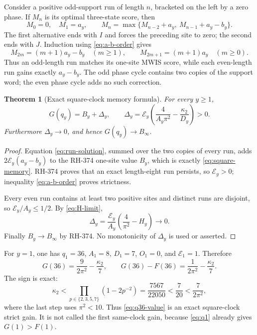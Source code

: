 \documentclass[11pt]{article}
\newtheorem{theorem}{Theorem}[section]
\theoremstyle{definition}
\theoremstyle{remark}
\newcommand{\kap}{\kappa_2}
\newcommand{\Ecal}{\mathcal E}
\begin{document}
Consider a positive odd-support run of length $n$, bracketed on the left by
a zero phase.  If $M_n$ is its optimal three-state score, then
\begin{equation}
 M_0=0,\quad M_1=a_y,\qquad
 M_n=\max\{M_{n-2}+a_y,\ M_{n-1}+a_y-b_y\}.
 \label{eq:run-recurrence}
\end{equation}
The first alternative ends with $I$ and forces the preceding site to zero;
the second ends with $J$.  Induction using \eqref{eq:a-b-order} gives
\begin{equation}
 M_{2m}=(m+1)a_y-b_y\quad(m\ge1),
 \qquad
 M_{2m+1}=(m+1)a_y\quad(m\ge0).
 \label{eq:run-solution}
\end{equation}
Thus an odd-length run matches its one-site MWIS score, while each
even-length run gains exactly $a_y-b_y$.  The odd phase cycle contains two
copies of the support word; the even phase cycle adds no such correction.

\begin{theorem}[Exact square-clock memory formula]
\label{thm:square-memory}
For every $y\ge1$,
\begin{equation}
 \boxed{\displaystyle
 G(q_y)=B_y+\Delta_y,\qquad
 \Delta_y=\Ecal_y\left(\frac4{A_y\pi^2}-\frac{\kap}{D_y}\right)>0.}
 \label{eq:square-memory}
\end{equation}
Furthermore $\Delta_y\to0$, and hence $G(q_y)\to B_\infty$.
\end{theorem}

\begin{proof}
Equation \eqref{eq:run-solution}, summed over the two copies of every run,
adds $2\Ecal_y(a_y-b_y)$ to the RH-374 one-site value $B_y$, which is
exactly \eqref{eq:square-memory}.  RH-374 proves that an exact length-eight
run persists, so $\Ecal_y>0$; inequality \eqref{eq:a-b-order} proves
strictness.

Every even run contains at least two positive sites and distinct runs are
disjoint, so $\Ecal_y/A_y\le1/2$.  By \eqref{eq:H-limit},
\[
 \Delta_y=\frac{\Ecal_y}{A_y}
           \left(\frac4{\pi^2}-H_y\right)\longrightarrow0.
\]
Finally $B_y\to B_\infty$ by RH-374.  No monotonicity of $\Delta_y$ is used
or asserted.
\end{proof}

For $y=1$, one has $q_1=36$, $A_1=8$, $D_1=7$, $O_1=0$, and
$\Ecal_1=1$.  Therefore
\begin{equation}
 G(36)=\frac9{2\pi^2}-\frac{\kap}{7},
 \qquad
 G(36)-F(36)=\frac1{2\pi^2}-\frac{\kap}{7}.
 \label{eq:q36-value}
\end{equation}
The sign is exact:
\begin{equation}
 \kap<\prod_{p\in\{2,3,5,7\}}(1-2p^{-2})
 =\frac{7567}{22050}<\frac7{20}<\frac7{2\pi^2},
 \label{eq:q36-strict}
\end{equation}
where the last step uses $\pi^2<10$.  Thus \eqref{eq:q36-value} is an
exact square-clock strict gain.  It is not called the first same-clock gain,
because \eqref{eq:q1} already gives $G(1)>F(1)$.
\end{document}
